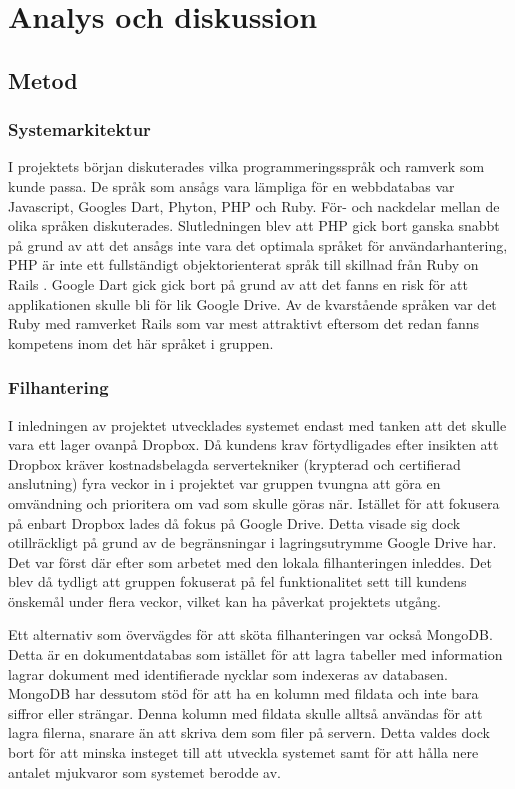 \chapter{Analys och diskussion}

\section{Metod}

\subsection{Systemarkitektur}

I projektets början diskuterades vilka programmeringsspråk och ramverk som kunde passa. De språk som ansågs vara lämpliga för en webbdatabas var Javascript, Googles Dart, Phyton, PHP och Ruby. För- och nackdelar mellan de olika språken diskuterades. Slutledningen blev att PHP gick bort ganska snabbt på grund av att det ansågs inte vara det optimala språket för användarhantering, PHP är inte ett fullständigt objektorienterat språk till skillnad från Ruby on Rails \cite{shiftdynamic}. Google Dart gick gick bort på grund av att det fanns en risk för att applikationen skulle bli för lik Google Drive. Av de kvarstående språken var det Ruby med ramverket Rails som var mest attraktivt eftersom det redan fanns kompetens inom det här språket i gruppen.

\subsection{Filhantering}

I inledningen av projektet utvecklades systemet endast med tanken att det skulle vara ett lager ovanpå Dropbox. Då kundens krav förtydligades efter insikten att Dropbox kräver kostnadsbelagda servertekniker (krypterad och certifierad anslutning) fyra veckor in i projektet var gruppen tvungna att göra en omvändning och prioritera om vad som skulle göras när. Istället för att fokusera på enbart Dropbox lades då fokus på Google Drive. Detta visade sig dock otillräckligt på grund av de begränsningar i lagringsutrymme Google Drive har. Det var först där efter som arbetet med den lokala filhanteringen inleddes. Det blev då tydligt att gruppen fokuserat på fel funktionalitet sett till kundens önskemål under flera veckor, vilket kan ha påverkat projektets utgång.

Ett alternativ som övervägdes för att sköta filhanteringen var också MongoDB. Detta är en dokumentdatabas som istället för att lagra tabeller med information lagrar dokument med identifierade nycklar som indexeras av databasen. MongoDB har dessutom stöd för att ha en kolumn med fildata och inte bara siffror eller strängar. Denna kolumn med fildata skulle alltså användas för att lagra filerna, snarare än att skriva dem som filer på servern. Detta valdes dock bort för att minska insteget till att utveckla systemet samt för att hålla nere antalet mjukvaror som systemet berodde av.

